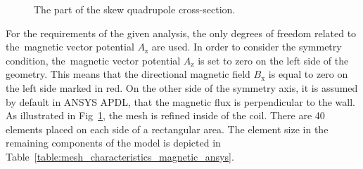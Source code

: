 \begin{figure}[H]
    \centering
    \caption{The  part of the skew quadrupole cross-section.}
    \label{fig:skew_quad_magnetic_mesh_ansys}
\end{figure}

For the requirements of the given analysis, the only degrees of freedom related to the~magnetic vector potential $A_\text{z}$ are used. In order to consider the symmetry condition, the~magnetic vector potential $A_\text{z}$ is set to zero on the left side of the geometry. This means that the directional magnetic field $B_\text{x}$ is equal to zero on the left side marked in red. On the other side of the symmetry axis, it is assumed by default in ANSYS APDL, that the magnetic flux is perpendicular to the wall. As illustrated in Fig~\ref{fig:skew_quad_magnetic_mesh_ansys}, the mesh is refined inside of the coil. There are 40 elements placed on each side of a rectangular area. The element size in the remaining components of the model is depicted in Table~\ref{table:mesh_characteristics_magnetic_ansys}.

